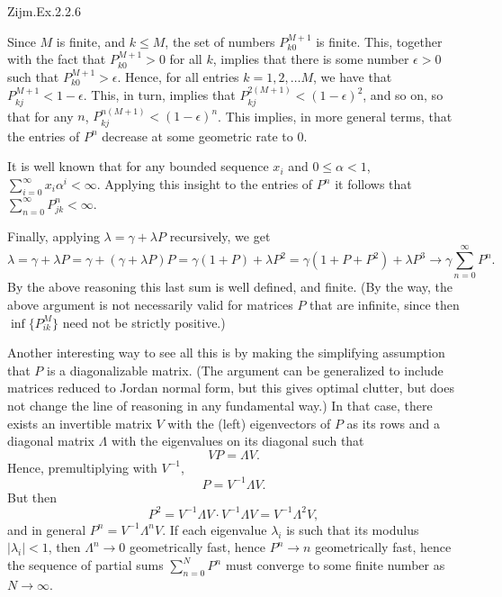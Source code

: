 \begin{exercise}
Zijm.Ex.2.2.6
\begin{solution}
  Since $M$ is finite, and $k\leq M$, the set of numbers
  $P^{M+1}_{k0}$ is finite. This, together with the fact that
  $P^{M+1}_{k0}>0$ for all $k$, implies that there is some number
  $\epsilon>0$ such that $P^{M+1}_{k0}>\epsilon$. Hence, for all
  entries $k=1, 2, \ldots M$, we have that
  $P^{M+1}_{kj} < 1- \epsilon$. This, in turn, implies that
  $P^{2(M+1)}_{kj} < (1- \epsilon)^2$, and so on, so that for any $n$,
  $P^{n(M+1)}_{kj} < (1- \epsilon)^n$. This implies, in more general
  terms, that the entries of $P^n$ decrease at some geometric rate to
  $0$.

  It is well known that for any bounded sequence $x_i$ and
  $0\leq \alpha < 1$, $ \sum_{i=0}^\infty x_i \alpha^i <
  \infty$. Applying this insight to the entries of $P^n$ it follows that 
$\sum_{n=0}^\infty P^n_{jk} < \infty$. 

Finally, applying  $\lambda = \gamma + \lambda P$ recursively, we get
\begin{equation*}
  \lambda = \gamma + \lambda P = \gamma + (\gamma + \lambda P)P = \gamma (1+P) + \lambda P^2 = \gamma(1+P+P^2) + \lambda P^3 \to \gamma \sum_{n=0}^\infty P^n.
\end{equation*}
By the above reasoning this last sum is well defined, and finite.  (By
the way, the above argument is not necessarily valid for matrices $P$
that are infinite, since then $\inf\{P^{M}_{ik}\}$ need not be
strictly positive.)

Another interesting way to see all this is by making the simplifying
assumption that $P$ is a diagonalizable matrix. (The argument can be
generalized to include matrices reduced to Jordan normal form, but
this gives optimal clutter, but does not change the line of reasoning in
any fundamental way.) In that case, there exists an invertible matrix
$V$ with the (left) eigenvectors of $P$ as its rows and a diagonal
matrix $\Lambda$ with the eigenvalues on its diagonal such that
\begin{equation*}
  V P = \Lambda V.
\end{equation*}
Hence, premultiplying with $V^{-1}$, 
\begin{equation*}
  P = V^{-1}\Lambda V.
\end{equation*}
But then
\begin{equation*}
P^2 = V^{-1}\Lambda V \cdot V^{-1}\Lambda V= V^{-1}\Lambda^2 V,
\end{equation*}
and in general $P^n = V^{-1}\Lambda^n V$. If each eigenvalue
$\lambda_i$ is such that its modulus $|\lambda_i| < 1$, then
$\Lambda^n \to 0$ geometrically fast, hence $P^n\to n$ geometrically
fast, hence the sequence of partial sums $\sum_{n=0}^N P^n$ must
converge to some finite number as $N\to\infty$. 


\end{solution}
\end{exercise}
